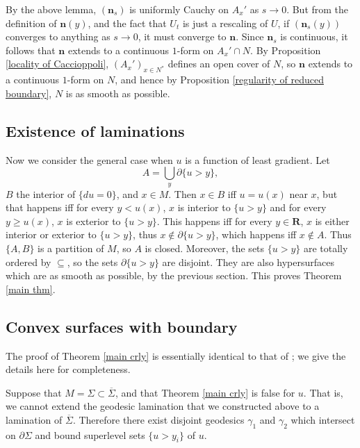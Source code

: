 \documentclass[reqno,12pt,letterpaper]{amsart}
\newcommand{\RR}{\mathbf{R}}
\newcommand{\normal}{\mathbf n}
\theoremstyle{definition}
\numberwithin{equation}{section}
\begin{document}
By the above lemma, $(\normal_s)$ is uniformly Cauchy on $A_x'$ as $s \to 0$.
But from the definition of $\normal(y)$, and the fact that $U_t$ is just a rescaling of $U$, if $(\normal_s(y))$ converges to anything as $s \to 0$, it must converge to $\normal$.
Since $\normal_s$ is continuous, it follows that $\normal$ extends to a continuous $1$-form on $A_x' \cap N$.
By Proposition \ref{locality of Caccioppoli}, $(A_x')_{x \in N^*}$ defines an open cover of $N$, so $\normal$ extends to a continuous $1$-form on $N$, and hence by Proposition \ref{regularity of reduced boundary}, $N$ is as smooth as possible.

\subsection{Existence of laminations}
Now we consider the general case when $u$ is a function of least gradient.
Let
\begin{equation}\label{lamination union}
A = \bigcup_y \partial \{u > y\},
\end{equation} $B$ the interior of $\{du = 0\}$, and $x \in M$.
Then $x \in B$ iff $u = u(x)$ near $x$, but that happens iff for every $y < u(x)$, $x$ is interior to $\{u > y\}$ and for every $y \geq u(x)$, $x$ is exterior to $\{u > y\}$.
This happens iff for every $y \in \RR$, $x$ is either interior or exterior to $\{u > y\}$, thus $x \notin \partial \{u > y\}$, which happens iff $x \notin A$.
Thus $\{A, B\}$ is a partition of $M$, so $A$ is closed.
Moreover, the sets $\{u > y\}$ are totally ordered by $\subseteq$, so the sets $\partial \{u > y\}$ are disjoint.
They are also hypersurfaces which are as smooth as possible, by the previous section.
This proves Theorem \ref{main thm}.

\subsection{Convex surfaces with boundary}
The proof of Theorem \ref{main crly} is essentially identical to that of \cite[Proposition 3.4]{górny2017planar}; we give the details here for completeness.

Suppose that $M = \Sigma \subset \overline \Sigma$, and that Theorem \ref{main crly} is false for $u$.
That is, we cannot extend the geodesic lamination that we constructed above to a lamination of $\overline \Sigma$.
Therefore there exist disjoint geodesics $\gamma_1$ and $\gamma_2$ which intersect on $\partial \Sigma$ and bound superlevel sets $\{u > y_i\}$ of $u$.
\end{document}
